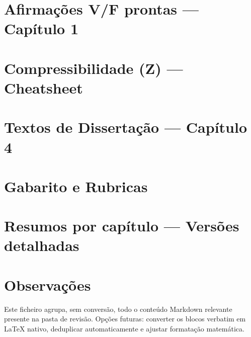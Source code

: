 \documentclass[11pt,a4paper]{article}
\begin{document}
\section{Afirmações V/F prontas — Capítulo 1}
\clearpage

\section{Compressibilidade (Z) — Cheatsheet}
\clearpage

\section{Textos de Dissertação — Capítulo 4}
\clearpage

\section{Gabarito e Rubricas}
\clearpage

\section{Resumos por capítulo — Versões detalhadas}
\clearpage
{}
\clearpage

\section*{Observações}
Este ficheiro agrupa, sem conversão, todo o conteúdo Markdown relevante presente na pasta de revisão.  
Opções futuras: converter os blocos verbatim em LaTeX nativo, deduplicar automaticamente e ajustar formatação matemática.
\end{document}
